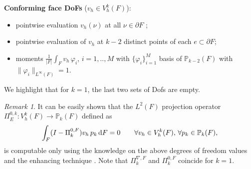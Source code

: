 \documentclass[a4paper,11pt]{article}
\theoremstyle{remark}
\newtheorem{remark}[theorem]{Remark}
\theoremstyle{definition}
\newcommand{\Pol}{\mathbb{P}}
\newcommand{\PiNablaF}{\Pi^{\nabla,F}_k}
\newcommand{\PiZeroF}{\Pi^{0,F}_k}
\begin{document}
\smallskip\noindent
{\bf Conforming face DoFs} ($v_h \in V_h^k(F)$):
\begin{itemize}
\item pointwise evaluation $v_h(\nu)$ at all $\nu \in \partial F$ ;
\vspace{-2mm}
\item pointwise evaluation of $v_h$ at $k-2$ distinct points of each $e \subset \partial F$;
\vspace{-2mm}
\item moments $\frac{1}{|F|}\int_F v_h \, \varphi_i$, $i=1,..,M$ with $\{ \varphi_i\}_{i=1}^M$ basis of $\Pol_{k-2}(F)$ with $\|\varphi_i \|_{L^\infty(F)} = 1 $.
\end{itemize}
We highlight that for $k=1$, the last two sets of Dofs are empty.
\begin{remark}\label{mimikyu}
It can be easily shown that the $L^2(F)$ projection operator $\Pi_E^{0,k} : V_h^k(F) \rightarrow \Pol_k(F)$ defined as
\[
\int_F (I - \PiZeroF) v_h \, p_k \,{\rm d}F = 0 \qquad \forall v_h \in V_h^k(F), \, \forall p_k\in\Pol_k(F),
\]
is computable only using the knowledge on the above degrees of freedom values and the enhancing technique \cite{BeiradaVeiga-Brezzi-Marini-Russo:2014}. Note that $\PiNablaF$ and $\PiZeroF$ coincide for $k=1$.
\end{remark}

\end{document}
